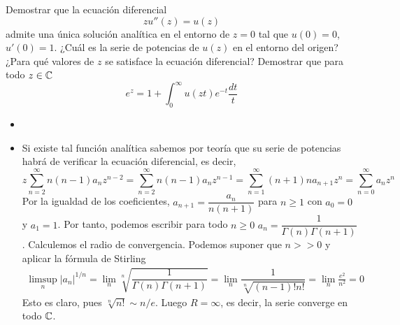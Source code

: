 \documentclass[twoside]{article}
\begin{document}
\begin{ejercicio}{6}
Demostrar que la ecuación diferencial
$$
zu''(z)=u(z)$$
admite una única solución analítica en el entorno de $z=0$ tal que $u(0)=0$, $u'(0)=1$.
¿Cuál es la serie de potencias de $u(z)$ en el entorno del origen? ¿Para qué valores de $z$ se satisface la ecuación diferencial?
Demostrar que para todo $z\in \mathbb{C}$ 
$$
e^z = 1 +  \int_0^\infty u(zt)e^{-t}\frac{dt}{t}
$$
\begin{solucion}
\begin{itemize}
\item[]
\item Si existe tal función analítica sabemos por teoría que su serie de potencias habrá de verificar la ecuación diferencial, es decir,
$$
z\sum_{n=2}^\infty n(n-1) a_n z^{n-2}= \sum_{n=2}^\infty n(n-1 )a_{n} z^{n-1} =  \sum_{n=1}^\infty (n+1)na_{n+1} z^{n} = \sum_{n=0}^\infty a_n z^n
$$
Por la igualdad de los coeficientes, $a_{n+1}=\dfrac{a_n}{n(n+1)}$ para $n\geq 1$ con $a_0 = 0$ y $a_1=1$. Por tanto, podemos escribir para todo $n\geq 0$ $a_n = \dfrac{1}{\Gamma(n)\Gamma(n+1)}$. Calculemos el radio de convergencia. Podemos suponer que $n>>0$ y aplicar la fórmula de Stirling
\begin{gather*}
\limsup_n |a_n|^{1/n} = \lim_n \sqrt[n]{\dfrac{1}{\Gamma(n)\Gamma(n+1)}} = \lim_n {\dfrac{1}{\sqrt[n]{(n-1)!n!}}} = \lim_n \frac{e^2}{n^2} = 0
\end{gather*}
Esto es claro, pues $\sqrt[n]{n!}\sim n/e$. Luego $R=\infty$, es decir, la serie converge en todo $\mathbb{C}$. 


\end{itemize}
\end{solucion}
\end{ejercicio}
\end{document}
